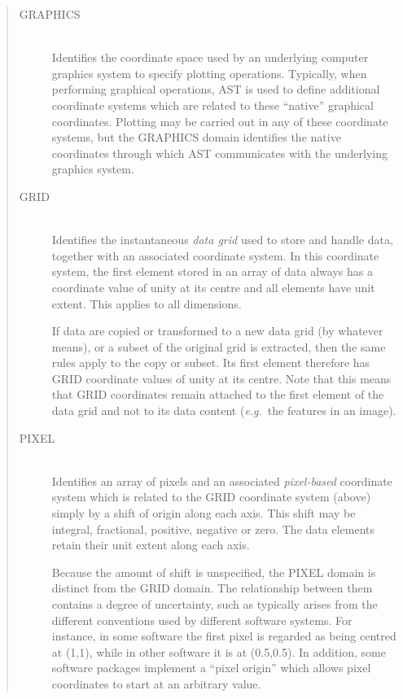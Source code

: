 \documentclass[twoside,11pt]{article}
\begin{document}
\begin{quote}
\begin{description}
\item[GRAPHICS]\mbox{}\\
Identifies the coordinate space used by an underlying computer
graphics system to specify plotting operations. Typically, when
performing graphical operations, AST is used to define additional
coordinate systems which are related to these ``native'' graphical
coordinates.  Plotting may be carried out in any of these coordinate
systems, but the GRAPHICS domain identifies the native coordinates
through which AST communicates with the underlying graphics system.

\item[GRID]\mbox{}\\
Identifies the instantaneous {\em{data grid}} used to store and handle
data, together with an associated coordinate system. In this
coordinate system, the first element stored in an array of data always
has a coordinate value of unity at its centre and all elements have
unit extent. This applies to all dimensions.

If data are copied or transformed to a new data grid (by whatever
means), or a subset of the original grid is extracted, then the same
rules apply to the copy or subset. Its first element therefore has
GRID coordinate values of unity at its centre. Note that this means
that GRID coordinates remain attached to the first element of the data
grid and not to its data content ({\em{e.g.}}\ the features in an
image).

\item[PIXEL]\mbox{}\\
Identifies an array of pixels and an associated {\em{pixel-based}}
coordinate system which is related to the GRID coordinate system
(above) simply by a shift of origin along each axis. This shift may be
integral, fractional, positive, negative or zero. The data elements
retain their unit extent along each axis.

Because the amount of shift is unspecified, the PIXEL domain is
distinct from the GRID domain. The relationship between them contains
a degree of uncertainty, such as typically arises from the different
conventions used by different software systems. For instance, in some
software the first pixel is regarded as being centred at (1,1), while
in other software it is at (0.5,0.5). In addition, some software
packages implement a ``pixel origin'' which allows pixel coordinates
to start at an arbitrary value.


\end{description}
\end{quote}
\end{document}
